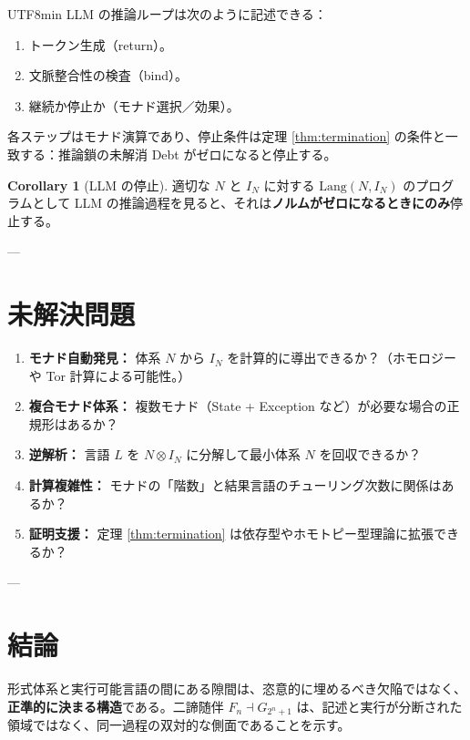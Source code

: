 \documentclass[a4paper,11pt]{article}
\renewcommand{\emph}[1]{\textbf{#1}}
\theoremstyle{definition}
\newtheorem{corollary}{Corollary}[section]
\begin{document}
\begin{CJK}{UTF8}{min}
LLM の推論ループは次のように記述できる：

\begin{enumerate}
  \item トークン生成（return）。
  \item 文脈整合性の検査（bind）。
  \item 継続か停止か（モナド選択／効果）。
\end{enumerate}

各ステップはモナド演算であり、停止条件は定理 \ref{thm:termination} の条件と一致する：推論鎖の未解消 Debt がゼロになると停止する。

\begin{corollary}[LLM の停止]
適切な $N$ と $I_N$ に対する $\text{Lang}(N, I_N)$ のプログラムとして LLM の推論過程を見ると、それは\emph{ノルムがゼロになるときにのみ}停止する。
\end{corollary}

---

\section{未解決問題}

\begin{enumerate}
  \item \textbf{モナド自動発見：} 体系 $N$ から $I_N$ を計算的に導出できるか？（ホモロジーや Tor 計算による可能性。）
  
  \item \textbf{複合モナド体系：} 複数モナド（State + Exception など）が必要な場合の正規形はあるか？
  
  \item \textbf{逆解析：} 言語 $L$ を $N \otimes I_N$ に分解して最小体系 $N$ を回収できるか？
  
  \item \textbf{計算複雑性：} モナドの「階数」と結果言語のチューリング次数に関係はあるか？
  
  \item \textbf{証明支援：} 定理 \ref{thm:termination} は依存型やホモトピー型理論に拡張できるか？
\end{enumerate}

---

\section{結論}

形式体系と実行可能言語の間にある隙間は、恣意的に埋めるべき欠陥ではなく、\emph{正準的に決まる構造}である。二諦随伴 $F_n \dashv G_{2^n+1}$ は、記述と実行が分断された領域ではなく、同一過程の双対的な側面であることを示す。


\end{CJK}
\end{document}
